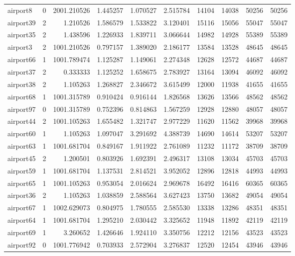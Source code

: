 \begin{longtable}{|l|r|r|r|r|r|r|r|r|r|}
airport8 & 0 & 2001.210526 & 1.445257 & 1.070527 & 2.515784 & 14104 & 14038 & 50256 & 50256 \\
airport39 & 2 & 1.210526 & 1.586579 & 1.533822 & 3.120401 & 15116 & 15056 & 55047 & 55047 \\
airport35 & 2 & 1.438596 & 1.226933 & 1.839711 & 3.066644 & 14982 & 14928 & 55389 & 55389 \\
airport3 & 2 & 1001.210526 & 0.797157 & 1.389020 & 2.186177 & 13584 & 13528 & 48645 & 48645 \\
airport66 & 1 & 1001.789474 & 1.125287 & 1.149061 & 2.274348 & 12628 & 12572 & 44687 & 44687 \\
airport37 & 2 & 0.333333 & 1.125252 & 1.658675 & 2.783927 & 13164 & 13094 & 46092 & 46092 \\
airport38 & 2 & 1.105263 & 1.268827 & 2.346672 & 3.615499 & 12000 & 11938 & 41655 & 41655 \\
airport68 & 1 & 1001.315789 & 0.910424 & 0.916144 & 1.826568 & 13626 & 13566 & 48562 & 48562 \\
airport97 & 0 & 1001.315789 & 0.752396 & 0.814863 & 1.567259 & 12928 & 12880 & 48057 & 48057 \\
airport44 & 2 & 1001.105263 & 1.655482 & 1.321747 & 2.977229 & 11620 & 11562 & 39968 & 39968 \\
airport60 & 1 & 1.105263 & 1.097047 & 3.291692 & 4.388739 & 14690 & 14614 & 53207 & 53207 \\
airport63 & 1 & 1001.681704 & 0.849167 & 1.911922 & 2.761089 & 11232 & 11172 & 38709 & 38709 \\
airport45 & 2 & 1.200501 & 0.803926 & 1.692391 & 2.496317 & 13108 & 13034 & 45703 & 45703 \\
airport59 & 1 & 1001.681704 & 1.137531 & 2.814521 & 3.952052 & 12896 & 12818 & 44993 & 44993 \\
airport65 & 1 & 1001.105263 & 0.953054 & 2.016624 & 2.969678 & 16492 & 16416 & 60365 & 60365 \\
airport36 & 2 & 1.105263 & 1.038859 & 2.588564 & 3.627423 & 13750 & 13682 & 49054 & 49054 \\
airport67 & 1 & 1002.629073 & 0.804975 & 1.780555 & 2.585530 & 13338 & 13286 & 48351 & 48351 \\
airport64 & 1 & 1001.681704 & 1.295210 & 2.030442 & 3.325652 & 11948 & 11892 & 42119 & 42119 \\
airport69 & 1 & 3.260652 & 1.426646 & 1.924110 & 3.350756 & 12212 & 12156 & 43523 & 43523 \\
airport92 & 0 & 1001.776942 & 0.703933 & 2.572904 & 3.276837 & 12520 & 12454 & 43946 & 43946 \\

\end{longtable}
